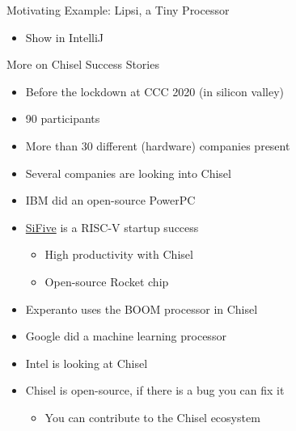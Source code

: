 \begin{frame}[fragile]{Motivating Example: Lipsi, a Tiny Processor}
\begin{itemize}
\item Show in IntelliJ
\end{itemize}
\end{frame}


\begin{frame}[fragile]{More on Chisel Success Stories}
\begin{itemize}
\item Before the lockdown at CCC 2020 (in silicon valley)
\item 90 participants
\item More than 30 different (hardware) companies present
\item Several companies are looking into Chisel
\item IBM did an open-source PowerPC
\item \href{https://www.sifive.com/}{SiFive} is a RISC-V startup success
\begin{itemize}
\item High productivity with Chisel
\item Open-source Rocket chip
\end{itemize}
\item Experanto uses the BOOM processor in Chisel
\item Google did a machine learning processor
\item Intel is looking at Chisel
\item Chisel is open-source, if there is a bug you can fix it
\begin{itemize}
\item You can contribute to the Chisel ecosystem
\end{itemize}
\end{itemize}
\end{frame}

